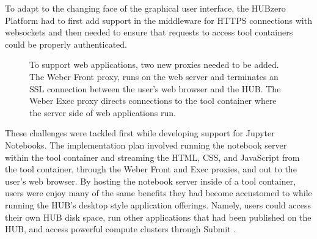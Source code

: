 \documentclass[conference]{../sty/IEEEtran}
\begin{document}
To adapt to the changing face of the graphical user interface, the HUBzero
Platform had to first add support in the middleware for HTTPS connections with
websockets and then needed to ensure that requests to access tool containers
could be properly authenticated.

\begin{figure}[H]
  \centering
  \caption{To support web applications, two new proxies needed to be added.
The Weber Front proxy, runs on the web server and terminates an SSL connection
between the user's web browser and the HUB. The Weber Exec proxy directs
connections to the tool container where the server side of web applications
 run.}
  \label{fig_arch}
\end{figure}



These challenges were tackled first while developing support for Jupyter
Notebooks.  The implementation plan involved running the notebook server within
the tool container and streaming the HTML, CSS, and JavaScript from the tool
container, through the Weber Front and Exec proxies, and out to the user's web
browser. By hosting the notebook server inside of a tool container, users were
enjoy many of the same benefits they had become accustomed to while running the
HUB's desktop style application offerings.  Namely, users could access their
own HUB disk space, run other applications that had been published on the HUB,
and access powerful compute clusters through Submit \cite{submit}.
\end{document}
